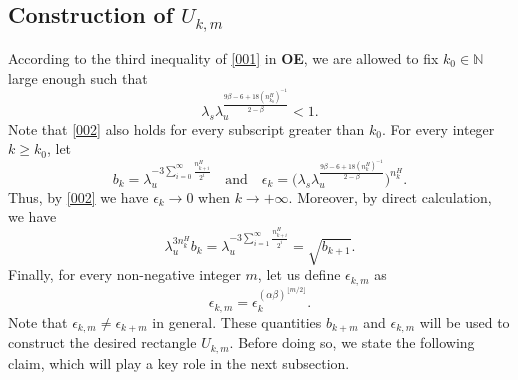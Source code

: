 \documentclass{amsart}
\theoremstyle{plain}
\theoremstyle{definition}
\theoremstyle{remark}
\numberwithin{equation}{section}
\begin{document}
\subsection{Construction of $U_{k,m}$}
According to the third inequality of \eqref{001} in {\bf OE}, we are allowed to fix $k_0\in\mathbb{N}$ large enough such that
\begin{equation}\label{002}
\lambda_s\lambda_u^{\frac{9\beta-6+18(n_{k_0}^H)^{-1}}{2-\beta}}<1.
\end{equation}
Note that \eqref{002} also holds for every subscript greater than $k_0$. For every integer $k\ge k_0$, let
\begin{equation}\label{003}
b_k=\lambda_u^{-3\sum_{i=0}^\infty \frac{n_{k+i}^H}{2^{i}}}
\quad\mbox{and}\quad
\epsilon_k=\Big(\lambda_s\lambda_u^{\frac{9\beta-6+18(n_k^H)^{-1}}{2-\beta}}\Big)^{n_k^H}.
\end{equation}
Thus, by \eqref{002} we have $\epsilon_k\to 0$ when $k\to +\infty$. Moreover, by direct calculation, we have
\begin{equation}\label{006}
\lambda_u^{3n_k^H}b_{k}=\lambda_u^{-3\sum_{i=1}^\infty \frac{n^H_{k+i}}{2^{i}}}=\sqrt{b_{k+1}}.
\end{equation}
Finally, for every non-negative integer $m$, let us define $\epsilon_{k,m}$ as 
\begin{equation}\label{004}
\epsilon_{k,m}=\epsilon_k^{(\alpha\beta)^{\lfloor m/2 \rfloor}}.
\end{equation}
Note that $\epsilon_{k,m} \neq \epsilon_{k+m}$ in general. 
These quantities $b_{k+m}$ and $\epsilon_{k,m}$ will be used to construct the desired rectangle $U_{k,m}$. Before doing so, we state the following claim, which will play a key role in the next subsection.
\end{document}
